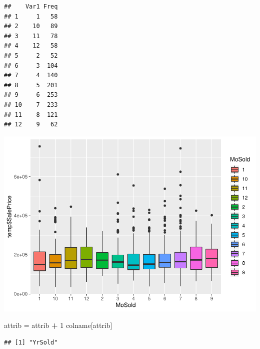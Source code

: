 \documentclass[]{article}
\newenvironment{Shaded}{\begin{snugshade}}{\end{snugshade}}
\newcommand{\DecValTok}[1]{\textcolor[rgb]{0.00,0.00,0.81}{#1}}
\newcommand{\StringTok}[1]{\textcolor[rgb]{0.31,0.60,0.02}{#1}}
\newcommand{\OperatorTok}[1]{\textcolor[rgb]{0.81,0.36,0.00}{\textbf{#1}}}
\newcommand{\NormalTok}[1]{#1}
\begin{document}
\begin{verbatim}
##    Var1 Freq
## 1     1   58
## 2    10   89
## 3    11   78
## 4    12   58
## 5     2   52
## 6     3  104
## 7     4  140
## 8     5  201
## 9     6  253
## 10    7  233
## 11    8  121
## 12    9   62
\end{verbatim}

\includegraphics{EDA_files/figure-latex/unnamed-chunk-99-1.pdf}

\begin{Shaded}
\begin{Highlighting}[]
\NormalTok{attrib =}\StringTok{ }\NormalTok{attrib }\OperatorTok{+}\StringTok{ }\DecValTok{1}
\NormalTok{colname[attrib]}
\end{Highlighting}
\end{Shaded}

\begin{verbatim}
## [1] "YrSold"
\end{verbatim}
\end{document}
